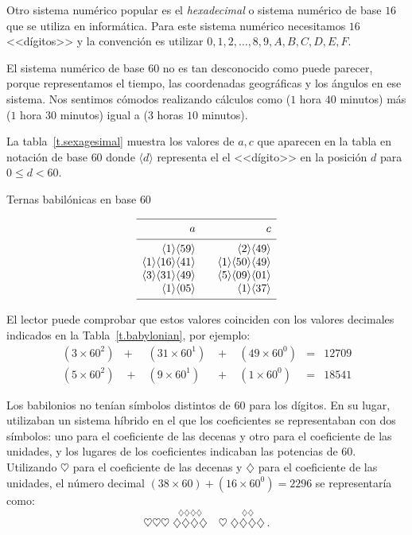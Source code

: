 Otro sistema numérico popular es el \emph{hexadecimal} o sistema numérico de base $16$ que se utiliza en informática. Para este sistema numérico necesitamos $16$ <<dígitos>> y la convención es utilizar $0,1,2,\ldots,8,9,A,B,C,D,E,F$.

El sistema numérico de base $60$ no es tan desconocido como puede parecer, porque representamos el tiempo, las coordenadas geográficas y los ángulos en ese sistema. Nos sentimos cómodos realizando cálculos como ($1$ hora $40$ minutos) más ($1$ hora $30$ minutos) igual a ($3$ horas $10$ minutos).

La tabla~\ref{t.sexagesimal} muestra los valores de $a,c$ que aparecen en la tabla en notación de base $60$ donde $\langle d\rangle$ representa el el <<dígito>> en la posición $d$ para $0\leq d<60$.
\begin{table}[t]
\caption{Ternas babilónicas en base $60$}\label{t.sexagesimal}
\[
\begin{array}{r@{$\quad\quad$}r}
\hline
\noalign{\smallskip}
a&c\\
\noalign{\smallskip}\hline\noalign{\smallskip}
\langle 1\rangle \langle 59 \rangle&\langle 2\rangle \langle 49 \rangle\\
\langle 1\rangle \langle 16 \rangle\langle 41\rangle&\langle 1\rangle \langle 50 \rangle\langle 49\rangle\\
\langle 3\rangle \langle 31 \rangle\langle 49\rangle&\langle 5\rangle \langle 09 \rangle\langle 01\rangle\\
\langle 1\rangle \langle 05 \rangle&\langle 1\rangle \langle 37 \rangle\\
\noalign{\smallskip}\hline
\end{array}
\]
\end{table}
El lector puede comprobar que estos valores coinciden con los valores decimales indicados en la Tabla~\ref{t.babylonian}, por ejemplo:
\[
\renewcommand{\arraystretch}{1.3}
\begin{array}{lclclcr}
(3\times 60^2) &+& (31\times 60^1) &\;+\;& (49\times 60^0) &=&   12709\\
(5\times 60^2) &\;+\;& (9\times 60^1) &\;+\;& (1\times 60^0) &=& 18541
\end{array}
\]

Los babilonios no tenían símbolos distintos de $60$ para los dígitos. En su lugar, utilizaban un sistema híbrido en el que los coeficientes se representaban con dos símbolos: uno para el coeficiente de las decenas y otro para el coeficiente de las unidades, y los lugares de los coeficientes indicaban las potencias de $60$. Utilizando $\heartsuit$ para el coeficiente de las decenas y $\diamondsuit$ para el coeficiente de las unidades, el número decimal $(38 \times 60)+(16 \times 60^0)=2296$ se representaría como:
\[
\heartsuit\heartsuit\heartsuit \; \stackrel{\displaystyle\diamondsuit\diamondsuit\diamondsuit\diamondsuit}{\diamondsuit\diamondsuit\diamondsuit\diamondsuit}
\quad
\heartsuit \; \stackrel{\displaystyle\diamondsuit\diamondsuit}{\diamondsuit\diamondsuit\diamondsuit\diamondsuit}\,.
\]


